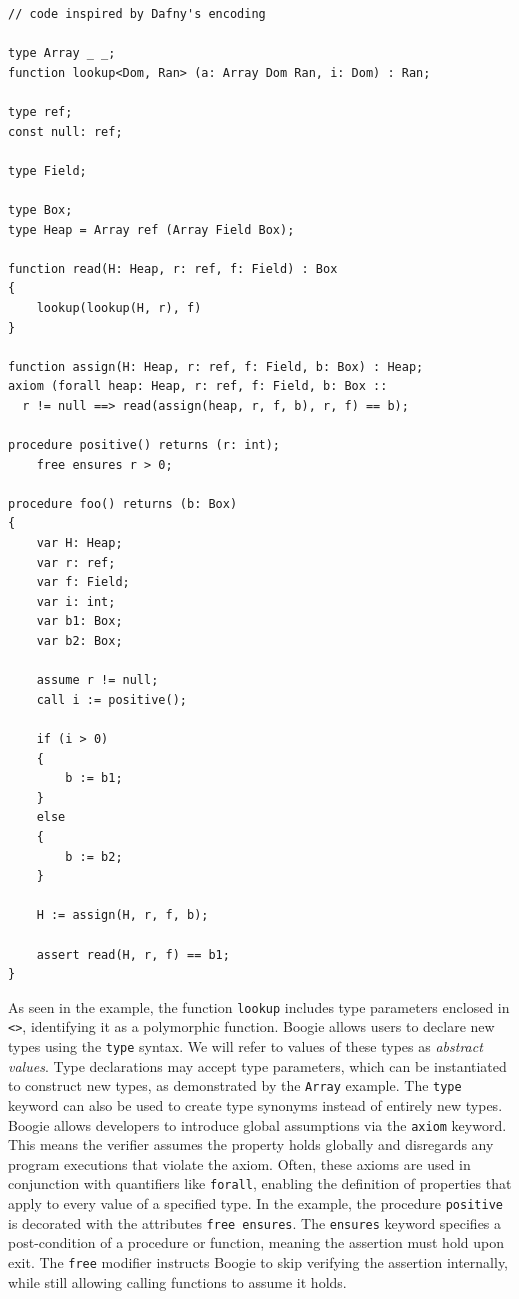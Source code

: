 \documentclass[11pt]{article}
\begin{document}
\begin{verbatim}
// code inspired by Dafny's encoding

type Array _ _;
function lookup<Dom, Ran> (a: Array Dom Ran, i: Dom) : Ran;

type ref;
const null: ref;

type Field;

type Box;
type Heap = Array ref (Array Field Box);

function read(H: Heap, r: ref, f: Field) : Box
{
    lookup(lookup(H, r), f)
}

function assign(H: Heap, r: ref, f: Field, b: Box) : Heap;
axiom (forall heap: Heap, r: ref, f: Field, b: Box ::
  r != null ==> read(assign(heap, r, f, b), r, f) == b);

procedure positive() returns (r: int);
    free ensures r > 0;

procedure foo() returns (b: Box)
{
    var H: Heap;
    var r: ref;
    var f: Field;
    var i: int;
    var b1: Box;
    var b2: Box;

    assume r != null;
    call i := positive();

    if (i > 0)
    {
        b := b1;
    }
    else
    {
        b := b2;
    }

    H := assign(H, r, f, b);

    assert read(H, r, f) == b1;
}
\end{verbatim}


As seen in the example, the function \texttt{lookup} includes type parameters enclosed in \texttt{<>},
identifying it as a polymorphic function.
Boogie allows users to declare new types using the \texttt{type} syntax.
We will refer to values of these types as \emph{abstract values}.
Type declarations may accept type parameters,
which can be instantiated to construct new types, as demonstrated by the \texttt{Array} example.
The \texttt{type} keyword can also be used to create type synonyms instead of entirely new types.
Boogie allows developers to introduce global assumptions via the \texttt{axiom} keyword.
This means the verifier assumes the property holds globally and disregards any program executions that violate the axiom.
Often, these axioms are used in conjunction with quantifiers like \texttt{forall}, 
enabling the definition of properties that apply to every value of a specified type.
In the example, the procedure \texttt{positive} is decorated with the attributes \texttt{free ensures}.
The \texttt{ensures} keyword specifies a post-condition of a procedure or function, 
meaning the assertion must hold upon exit.
The \texttt{free} modifier instructs Boogie to skip verifying the assertion internally,
while still allowing calling functions to assume it holds.
\end{document}
